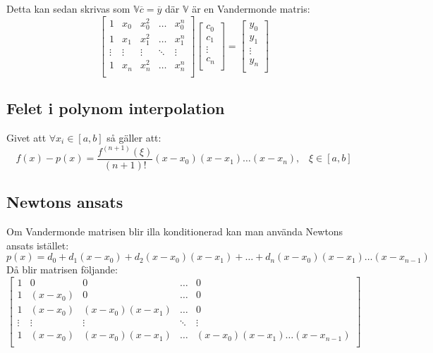 \documentclass[a4paper,11pt]{article}
\begin{document}
Detta kan sedan skrivas som $\mathbb{V}\overline{c} = \overline{y}$ där $\mathbb{V}$ är en Vandermonde matris:
\[
\begin{bmatrix}
    1 & x_0 & x_0^2 & \hdots & x_0^n \\
    1 & x_1 & x_1^2 & \hdots & x_1^n \\
    \vdots & \vdots & \vdots & \ddots & \vdots \\
    1 & x_n & x_n^2 & \hdots & x_n^n \\
\end{bmatrix}
\begin{bmatrix}
    c_0 \\
    c_1 \\
    \vdots \\
    c_n \\
\end{bmatrix}
=
\begin{bmatrix}
    y_0 \\
    y_1 \\
    \vdots \\
    y_n \\
\end{bmatrix}
\]

\subsection{Felet i polynom interpolation}
Givet att $\forall x_i \in [a, b]$ så gäller att:
\[
f(x) - p(x) = \frac{f^{(n+1)}(\xi)}{(n+1)!}(x - x_0)(x - x_1)\hdots(x - x_n), \hspace{10pt} \xi \in [a, b]
\]


\subsection{Newtons ansats}
Om Vandermonde matrisen blir illa konditionerad kan man använda Newtons ansats istället:
\[
p(x) = d_0 + d_1(x - x_0) + d_2(x - x_0)(x - x_1) + \hdots + d_n(x - x_0)(x - x_1)\hdots(x - x_{n-1})
\]
Då blir matrisen följande:
\[
\begin{bmatrix}
    1 & 0 & 0 & \hdots & 0 \\
    1 & (x - x_0) & 0 & \hdots & 0 \\
    1 & (x - x_0) & (x - x_0)(x - x_1) & \hdots & 0 \\
    \vdots & \vdots & \vdots & \ddots & \vdots \\
    1 & (x - x_0) & (x - x_0)(x - x_1) & \hdots & (x - x_0)(x - x_1)\hdots(x - x_{n-1}) \\
\end{bmatrix}
\]
\end{document}
